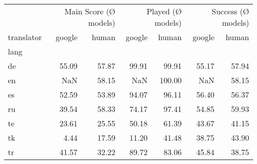 \begin{tabular}{lrrrrrr}
\toprule
 & \multicolumn{2}{r}{Main Score (Ø models)} & \multicolumn{2}{r}{Played (Ø models)} & \multicolumn{2}{r}{Success (Ø models)} \\
translator & google & human & google & human & google & human \\
lang &  &  &  &  &  &  \\
\midrule
de & 55.09 & 57.87 & 99.91 & 99.91 & 55.17 & 57.94 \\
en & NaN & 58.15 & NaN & 100.00 & NaN & 58.15 \\
es & 52.59 & 53.89 & 94.07 & 96.11 & 56.40 & 56.37 \\
ru & 39.54 & 58.33 & 74.17 & 97.41 & 54.85 & 59.93 \\
te & 23.61 & 25.55 & 50.18 & 61.39 & 43.67 & 41.15 \\
tk & 4.44 & 17.59 & 11.20 & 41.48 & 38.75 & 43.90 \\
tr & 41.57 & 32.22 & 89.72 & 83.06 & 45.84 & 38.75 \\
\bottomrule
\end{tabular}
